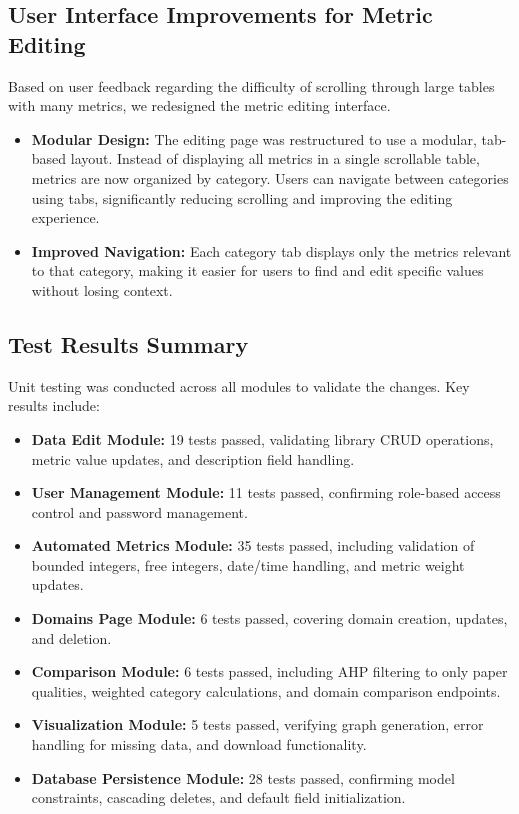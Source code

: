 \documentclass[12pt, titlepage]{article}
\begin{document}
\subsection{User Interface Improvements for Metric Editing}
Based on user feedback regarding the difficulty of scrolling through large tables with many metrics, we redesigned the metric editing interface.

\begin{itemize}
  \item \textbf{Modular Design:} The editing page was restructured to use a modular, tab-based layout. Instead of displaying all metrics in a single scrollable table, metrics are now organized by category. Users can navigate between categories using tabs, significantly reducing scrolling and improving the editing experience.

  \item \textbf{Improved Navigation:} Each category tab displays only the metrics relevant to that category, making it easier for users to find and edit specific values without losing context.
\end{itemize}

\subsection{Test Results Summary}
Unit testing was conducted across all modules to validate the changes. Key results include:

\begin{itemize}
  \item \textbf{Data Edit Module:} 19 tests passed, validating library CRUD operations, metric value updates, and description field handling.

  \item \textbf{User Management Module:} 11 tests passed, confirming role-based access control and password management.

  \item \textbf{Automated Metrics Module:} 35 tests passed, including validation of bounded integers, free integers, date/time handling, and metric weight updates.

  \item \textbf{Domains Page Module:} 6 tests passed, covering domain creation, updates, and deletion.

  \item \textbf{Comparison Module:} 6 tests passed, including AHP filtering to only paper qualities, weighted category calculations, and domain comparison endpoints.

  \item \textbf{Visualization Module:} 5 tests passed, verifying graph generation, error handling for missing data, and download functionality.

  \item \textbf{Database Persistence Module:} 28 tests passed, confirming model constraints, cascading deletes, and default field initialization.
\end{itemize}
\end{document}
